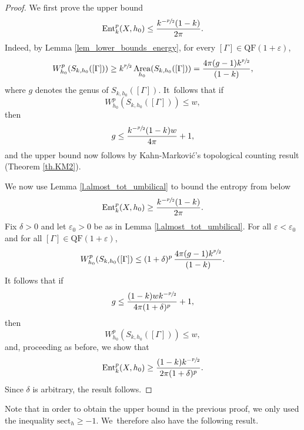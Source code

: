 \documentclass[JEP,XML,SOM,Unicode,NoEqCountersInSection,published]{cedram}
\theoremstyle{plain}
\theoremstyle{definition}
\let\eps\varepsilon
\newcommand{\sect}{\mathrm{sect}}
\newcommand{\Ent}{\mathrm{Ent}}
\newcommand{\QF}{\mathrm{QF}}
\DeclareMathOperator{\Area}{Area}
\begin{document}
\begin{proof}
We first prove the upper bound
\begin{equation*}
\Ent^p_{k}(X,h_0)\leq\frac{k^{-\sfrac{p}{2}}(1-k)}{2\pi}.
\end{equation*}
Indeed, by Lemma \ref{lem_lower_bounds_energy}, for every $[\Gamma]\in\QF(1+\eps)$,
\begin{equation*}
W_{h_0}^{p}(S_{k,h_0}([\Gamma]))\geq k^{\sfrac{p}{2}}\Area_{h_0}(S_{k,h_0}([\Gamma]))=\frac{4\pi(g-1)k^{\sfrac{p}{2}}}{(1-k)},
\end{equation*}
where $g$ denotes the genus of $S_{k,h_0}([\Gamma])$. It~follows that if
\begin{equation*}
W_{h_0}^{p}(S_{k,h_0}([\Gamma])) \leq w,
\end{equation*}
then
\begin{equation*}
g \leq \frac{k^{-\sfrac{p}{2}}(1-k)w}{4\pi} + 1,
\end{equation*}
and the upper bound now follows by Kahn-Markovi\'c's topological counting result (Theorem \ref{th.KM2}).

We now use Lemma \ref{l.almost_tot_umbilical} to bound the entropy from below
\begin{equation*}
\Ent^p_{k}(X,h_0)\geq\frac{k^{-\sfrac{p}{2}}(1-k)}{2\pi}.
\end{equation*}
Fix $\delta>0$ and let $\eps_0>0$ be as in Lemma \ref{l.almost_tot_umbilical}. For all $\eps<\eps_0$ and for all $[\Gamma]\in\QF(1+\eps)$,
\begin{equation*}
W^{p}_{h_0}(S_{k,h_0}([\Gamma])\leq (1+\delta)^p\,\frac{4\pi(g-1)k^{\sfrac{p}{2}}}{(1-k)}.
\end{equation*}
It follows that if
\begin{equation*}
g \leq \frac{(1-k)w k^{-\sfrac{p}{2}}}{4\pi(1+\delta)^p} + 1,
\end{equation*}
then
\begin{equation*}
W_{h_0}^{p}(S_{k,h_0}([\Gamma])) \leq w,
\end{equation*}
and, proceeding as before, we show that
\begin{equation*}
\Ent^{p}_{k}(X,h_0)\geq\frac{(1-k)k^{-\sfrac{p}{2}}}{2\pi(1+\delta)^p}.
\end{equation*}
Since $\delta$ is arbitrary, the result follows.
\end{proof}

Note that in order to obtain the upper bound in the previous proof, we only used the inequality $\sect_h\geq -1$. We~therefore also have the following result.
\end{document}
